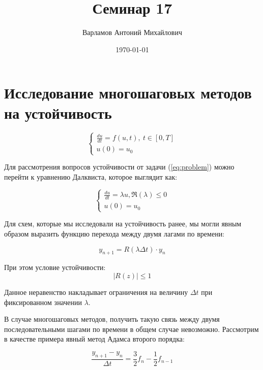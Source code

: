 \documentclass[10pt,a4paper]{article}
\title{Семинар 17}
\date{\today}
\author{Варламов Антоний Михайлович}
\begin{document}
	\maketitle

	\section{Исследование многошаговых методов на устойчивость}	
	
	\begin{equation}\label{eq:problem}
		\begin{cases}
			\frac{d{u}}{dt} = {f}\left(u, t\right), \ t\in[0, T]
			\\
			{u}\left(0\right) = {u}_{0}
		\end{cases}
	\end{equation}
	
	Для рассмотрения вопросов устойчивости от задачи (\ref{eq:problem}) можно 
	перейти к уравнению Далквиста, которое выглядит как:
	
	\begin{equation}
			\begin{cases}
				\frac{du}{dt} = \lambda u, \Re\left(\lambda\right) \leqslant 0
				\\
				u\left(0\right) = u_{0}
			\end{cases}
	\end{equation}
	
	Для схем, которые мы исследовали на устойчивость ранее, мы могли явным 
	образом выразить функцию перехода между двумя лагами по времени:
	
	\begin{equation}
		y_{n + 1} = R\left(\lambda\Delta t\right) \cdot y_{n}
	\end{equation}
	
	При этом условие устойчивости: 
	\begin{equation}
		\left|R\left(z\right)\right| \leqslant 1
	\end{equation}
	
	Данное неравенство накладывает ограничения на величину $\Delta t$ при 
	фиксированном значении $\lambda$.
	
	В случае многошаговых методов, получить такую связь между двумя 
	последовательными шагами по времени в общем случае невозможно. Рассмотрим в 
	качестве примера явный метод Адамса второго порядка:
	
	\begin{equation}
		\frac{y_{n + 1} - y_{n}}{\Delta t} = \frac{3}{2}f_{n} - \frac{1}{2}f_{n 
		- 1}
	\end{equation}
	
\end{document}
